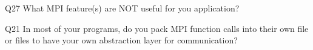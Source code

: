 \begin{description}%
\item{Q27} What MPI feature(s) are NOT useful for you application?%
\item{Q21} In most of your programs, do you pack MPI function calls into their own file or files to have your own abstraction layer for communication?%
\end{description}%

